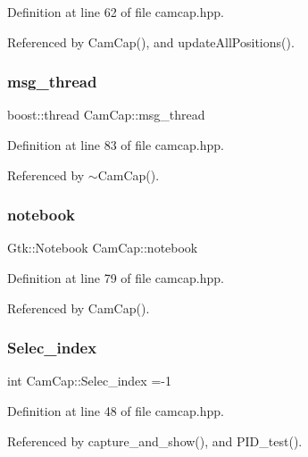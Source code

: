 Definition at line 62 of file camcap.\+hpp.



Referenced by Cam\+Cap(), and update\+All\+Positions().

\mbox{\label{class_cam_cap_a0aedb5217ab6aa3d7c383a6f39c940cd}} 
\subsubsection{\texorpdfstring{msg\+\_\+thread}{msg\_thread}}
{\footnotesize\ttfamily boost\+::thread Cam\+Cap\+::msg\+\_\+thread}



Definition at line 83 of file camcap.\+hpp.



Referenced by $\sim$\+Cam\+Cap().

\mbox{\label{class_cam_cap_acccac8a77e94926ef3d4a79bd9b94f56}} 
\subsubsection{\texorpdfstring{notebook}{notebook}}
{\footnotesize\ttfamily Gtk\+::\+Notebook Cam\+Cap\+::notebook}



Definition at line 79 of file camcap.\+hpp.



Referenced by Cam\+Cap().

\mbox{\label{class_cam_cap_a26dab6605daa1e18cdced96ea1ad5cbf}} 
\subsubsection{\texorpdfstring{Selec\+\_\+index}{Selec\_index}}
{\footnotesize\ttfamily int Cam\+Cap\+::\+Selec\+\_\+index =-\/1}



Definition at line 48 of file camcap.\+hpp.



Referenced by capture\+\_\+and\+\_\+show(), and P\+I\+D\+\_\+test().

